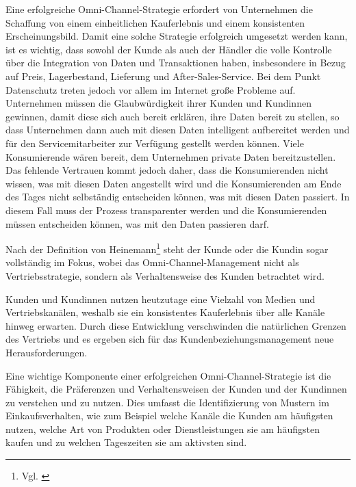 Eine erfolgreiche Omni-Channel-Strategie erfordert von Unternehmen die Schaffung von einem einheitlichen Kauferlebnis und einem konsistenten Erscheinungsbild. Damit eine solche Strategie erfolgreich umgesetzt werden kann, ist es wichtig, dass sowohl der Kunde als auch der Händler die volle Kontrolle über die Integration von Daten und Transaktionen haben, insbesondere in Bezug auf Preis, Lagerbestand, Lieferung und After-Sales-Service.
\newline
Bei dem Punkt Datenschutz treten jedoch vor allem im Internet große Probleme auf. Unternehmen müssen die Glaubwürdigkeit ihrer Kunden und Kundinnen gewinnen, damit diese sich auch bereit erklären, ihre Daten bereit zu stellen, so dass Unternehmen dann auch mit diesen Daten intelligent aufbereitet werden und für den Servicemitarbeiter zur Verfügung gestellt werden können.
Viele Konsumierende wären bereit, dem Unternehmen private Daten bereitzustellen. Das fehlende Vertrauen kommt jedoch daher, dass die Konsumierenden nicht wissen, was mit diesen Daten angestellt wird und die Konsumierenden am Ende des Tages nicht selbständig entscheiden können, was mit diesen Daten passiert. In diesem Fall muss der Prozess transparenter werden und die Konsumierenden müssen entscheiden können, was mit den Daten passieren darf.

Nach der Definition von Heinemann\footnote{Vgl. \autocite [S. 10] {Boeckenholt2018}} steht der Kunde oder die Kundin sogar vollständig im Fokus, wobei das Omni-Channel-Management nicht als Vertriebsstrategie, sondern als Verhaltensweise des Kunden betrachtet wird.
\newline

Kunden und Kundinnen nutzen heutzutage eine Vielzahl von Medien und Vertriebskanälen, weshalb sie ein konsistentes Kauferlebnis über alle Kanäle hinweg erwarten. Durch diese Entwicklung verschwinden die natürlichen Grenzen des Vertriebs und es ergeben sich für das Kundenbeziehungsmanagement neue Herausforderungen.
\newline

Eine wichtige Komponente einer erfolgreichen Omni-Channel-Strategie ist die Fähigkeit, die Präferenzen und Verhaltensweisen der Kunden und der Kundinnen zu verstehen und zu nutzen. Dies umfasst die Identifizierung von Mustern im Einkaufsverhalten, wie zum Beispiel welche Kanäle die Kunden am häufigsten nutzen, welche Art von Produkten oder Dienstleistungen sie am häufigsten kaufen und zu welchen Tageszeiten sie am aktivsten sind.
\newline

